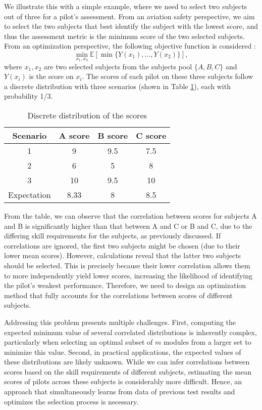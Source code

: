 \documentclass[opre,sglanonrev]{informs4}
\begin{document}
We illustrate this with a simple example, where we need to select two subjects out of three for a pilot's assessment. From an aviation safety perspective, we aim to select the two subjects that best identify the subject with the lowest score, and thus the assessment metric is the minimum score of the two selected subjects. From an optimization perspective, the following objective function is considered   :
$$
	\min_{x_1,x_2} \mathbb{E}[\min\{Y(x_1),...,Y(x_2) \} ], 
	\label{example}
$$
where $x_1,x_2$ are two selected subjects from the subjects pool $\{A,B,C\}$ and $Y(x_i)$ is the score on $x_i$. The scores of each pilot on these three subjects follow a discrete distribution with three scenarios (shown in Table \ref{tab:example}), each with probability 1/3.
\begin{table}[ht]
	\centering
	\caption{Discrete distribution of the scores}
	\label{tab:example}
	\begin{tabular}{cccc} 
		Scenario & A score & B score & C score \\ \hline 
		1 & 9 & 9.5 & 7.5\\
		2 & 6 & 5 & 8\\
		3 & 10 & 9.5 & 10\\
		Expectation & 8.33 & 8 & 8.5\\
	\end{tabular}
\end{table}
From the table, we can observe that the correlation between scores for subjects A and B is significantly higher than that between A and C or B and C, due to the differing skill requirements for the subjects, as previously discussed. If correlations are ignored, the first two subjects might be chosen (due to their lower mean scores). However, calculations reveal that the latter two subjects should be selected. This is precisely because their lower correlation allows them to more independently yield lower scores, increasing the likelihood of identifying the pilot’s weakest performance. Therefore, we need to design an optimization method that fully accounts for the correlations between scores of different subjects.

Addressing this problem presents multiple challenges. First, computing the expected minimum value of several correlated distributions is inherently complex, particularly when selecting an optimal subset of $m$ modules from a larger set to minimize this value. Second, in practical applications, the expected values of these distributions are likely unknown. While we can infer correlations between scores based on the skill requirements of different subjects, estimating the mean scores of pilots across these subjects is considerably more difficult. Hence, an approach that simultaneously learns from data of previous test results and optimizes the selection process is necessary.
\end{document}
